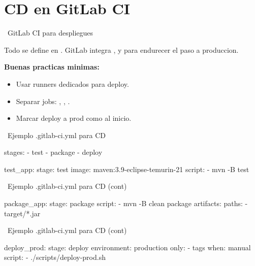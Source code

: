 \documentclass[aspectratio=169]{beamer}
\begin{document}
\section{CD en GitLab CI}

\begin{frame}{\faGitlab\ GitLab CI para despliegues}
	\begin{darkbox}
		Todo se define en . GitLab integra ,  y  para endurecer el paso a produccion.
	\end{darkbox}

	\vspace{0.35cm}
	\textbf{Buenas practicas minimas:}
	\begin{itemize}
		\item Usar runners dedicados para deploy.
		\item Separar jobs: , , .
		\item Marcar deploy a prod como  al inicio.
	\end{itemize}
\end{frame}

\begin{frame}[fragile]{\faGitlab\ Ejemplo .gitlab-ci.yml para CD}
\begin{yamlcodebox}
stages:
  - test
  - package
  - deploy

test_app:
  stage: test
  image: maven:3.9-eclipse-temurin-21
  script:
	- mvn -B test
\end{yamlcodebox}
\end{frame}
\begin{frame}[fragile]{\faGitlab\ Ejemplo .gitlab-ci.yml para CD (cont)}
\begin{yamlcodebox}
package_app:
  stage: package
  script:
	- mvn -B clean package
  artifacts:
	paths:
	  - target/*.jar
\end{yamlcodebox}
\end{frame}
\begin{frame}[fragile]{\faGitlab\ Ejemplo .gitlab-ci.yml para CD (cont)}
\begin{yamlcodebox}
deploy_prod:
  stage: deploy
  environment: production
  only:
	- tags
  when: manual
  script:
	- ./scripts/deploy-prod.sh
\end{yamlcodebox}
\end{frame}
\end{document}
